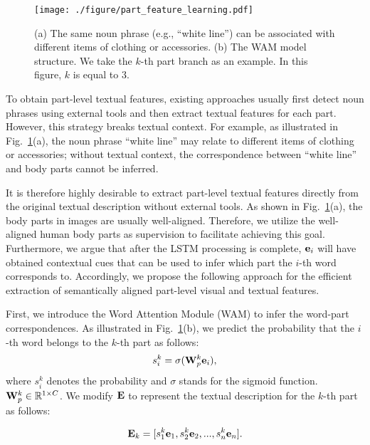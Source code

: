 \documentclass[journal]{IEEEtran}
\begin{document}
\begin{figure}[t]
\begin{center}
\texttt{[image: ./figure/part\_feature\_learning.pdf]}
\end{center}
   \caption{ (a) The same noun phrase (e.g., ``white line'') can be associated with different items of clothing or accessories. (b) The WAM model structure. We take the $k$-th part branch as an example. In this figure, $k$ is equal to 3.}
\label{fig:part_feature_learning}
\end{figure}

To obtain part-level textual features, existing approaches \cite{jing2020pose,niu2020improving,wang2020vitaa} usually first detect noun phrases using external tools  and then extract textual features for each part. However, this strategy breaks textual context. For example, as illustrated in Fig.~\ref{fig:part_feature_learning}(a), the noun phrase ``white line'' may relate to different items of clothing or accessories; without textual context, the correspondence between ``white line'' and body parts cannot be inferred.

It is therefore highly desirable to extract part-level textual features directly from the original textual description without external tools. As shown in Fig.~\ref{fig:part_feature_learning}(a), the body parts in images are usually well-aligned. Therefore, we utilize the well-aligned human body parts as supervision to facilitate achieving this goal. Furthermore, we argue that after the LSTM processing is complete, ${\bf{e}}_i$  will have obtained contextual cues that can be used to infer which part the $i$-th word corresponds to. Accordingly, we propose the following approach for the efficient extraction of semantically aligned part-level visual and textual features.

First, we introduce the Word Attention Module (WAM) to infer the word-part correspondences. As illustrated in Fig.~\ref{fig:part_feature_learning}(b), we predict the probability that the $i$-th word belongs to the $k$-th part as follows:
\begin{equation}
{{s}_i^k} = \sigma({\bf{W}}_{p}^k{{\bf{e}}_i}),
\end{equation}
where ${s}_i^k$ denotes the probability and $\sigma$ stands for the sigmoid function. ${\bf{W}}_{p}^{k} \in \mathbb{R}^{1 \times C}$. We modify  $\bf{E}$ to represent the textual description for the $k$-th part as follows:


\begin{equation}
{\bf{E}}_k = [{{s}_1^k}{\bf{e}}_1,{{s}_2^k}{\bf{e}}_2, ..., {{s}_n^k}{\bf{e}}_n].
\end{equation}
\end{document}
